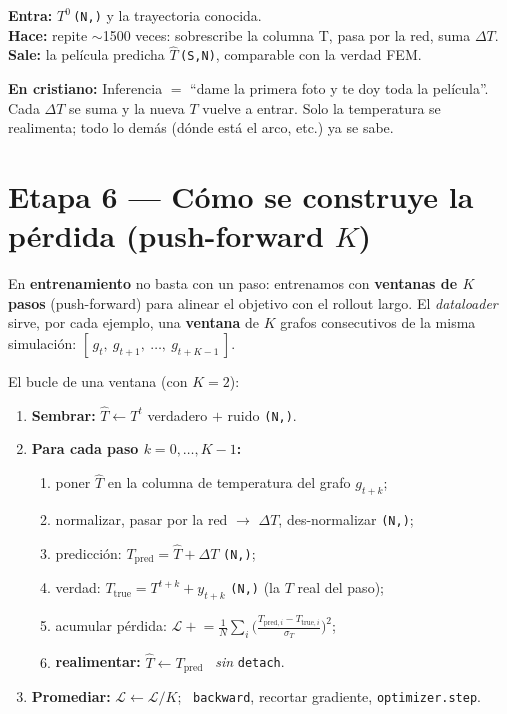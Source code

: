 \documentclass[11pt]{article}
\newcommand{\shp}[1]{{\color{shapecol}\texttt{(#1)}}}   %
\theoremstyle{definition}
\newcommand{\dummies}[1]{%
  \par\smallskip\noindent
  \colorbox{yellow!18}{\parbox{\dimexpr\linewidth-2\fboxsep}{%
  \small\textbf{En cristiano:} #1}}\par\smallskip}
\newcommand{\io}[3]{%
  \par\smallskip\noindent
  \colorbox{blue!6}{\parbox{\dimexpr\linewidth-2\fboxsep}{\small
  \textbf{Entra:} #1 \\ \textbf{Hace:} #2 \\ \textbf{Sale:} #3}}\par\smallskip}
\begin{document}
\io{$T^0$\,\shp{N,} y la trayectoria conocida.}
{repite $\sim$1500 veces: sobrescribe la columna T, pasa por la red, suma $\Delta T$.}
{la película predicha $\widehat T$\,\shp{S,N}, comparable con la verdad FEM.}

\dummies{Inferencia $=$ ``dame la primera foto y te doy toda la película''. Cada
$\Delta T$ se suma y la nueva $T$ vuelve a entrar. Solo la temperatura se realimenta;
todo lo demás (dónde está el arco, etc.) ya se sabe.}

\section{Etapa 6 — Cómo se construye la pérdida (push-forward $K$)}
\label{sec:loss}

En \textbf{entrenamiento} no basta con un paso: entrenamos con \textbf{ventanas de
$K$ pasos} (push-forward) para alinear el objetivo con el rollout largo. El
\emph{dataloader} sirve, por cada ejemplo, una \textbf{ventana} de $K$ grafos
consecutivos de la misma simulación: $[\,g_t,\ g_{t+1},\ \dots,\ g_{t+K-1}\,]$.

El bucle de una ventana (con $K{=}2$):
\begin{enumerate}[leftmargin=1.5em]
  \item \textbf{Sembrar:} $\hat T \gets T^{t}$ verdadero $+$ ruido \shp{N,}.
  \item \textbf{Para cada paso $k=0,\dots,K{-}1$:}
  \begin{enumerate}[leftmargin=1.3em,label=(\alph*)]
    \item poner $\hat T$ en la columna de temperatura del grafo $g_{t+k}$;
    \item normalizar, pasar por la red $\to$ $\Delta T$, des-normalizar \shp{N,};
    \item predicción: $T_{\text{pred}} = \hat T + \Delta T$ \shp{N,};
    \item verdad: $T_{\text{true}} = T^{t+k} + y_{t+k}$ \shp{N,} (la $T$ real del paso);
    \item acumular pérdida:
      $\displaystyle \mathcal L \mathrel{+}= \frac1N\sum_i\Big(\frac{T_{\text{pred},i}-T_{\text{true},i}}{\sigma_T}\Big)^2$;
    \item \textbf{realimentar:} $\hat T \gets T_{\text{pred}}$ \ \emph{sin} \texttt{detach}.
  \end{enumerate}
  \item \textbf{Promediar:} $\mathcal L \gets \mathcal L / K$; \ \texttt{backward}, recortar gradiente, \texttt{optimizer.step}.
\end{enumerate}
\end{document}

